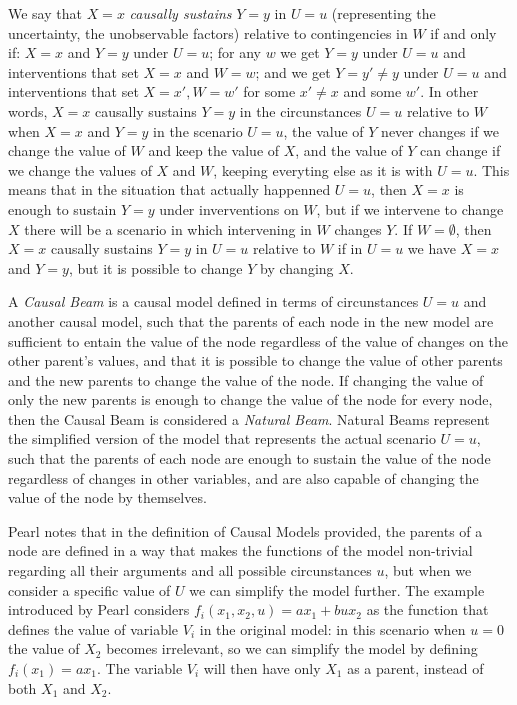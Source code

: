 We say that $X=x$ \emph{causally sustains} $Y=y$ in $U=u$ (representing the uncertainty, the unobservable factors) relative to contingencies in $W$ if and only if: $X=x$ and $Y=y$ under $U=u$; for any $w$ we get $Y=y$ under $U=u$ and interventions that set $X=x$ and $W=w$; and we get $Y=y' \neq y$ under $U=u$ and interventions that set $X=x',W=w'$ for some $x' \neq x$ and some $w'$. In other words, $X=x$ causally sustains $Y=y$ in the circunstances $U=u$ relative to $W$ when $X=x$ and $Y=y$ in the scenario $U=u$, the value of $Y$ never changes if we change the value of $W$ and keep the value of $X$, and the value of $Y$ can change if we change the values of $X$ and $W$, keeping everyting else as it is with $U=u$. This means that in the situation that actually happenned $U=u$, then $X=x$ is enough to sustain $Y=y$ under inverventions on $W$, but if we intervene to change $X$ there will be a scenario in which intervening in $W$ changes $Y$. If $W=\emptyset$, then $X=x$ causally sustains $Y=y$ in $U=u$ relative to $W$ if in $U=u$ we have $X=x$ and $Y=y$, but it is possible to change $Y$ by changing $X$.

A \emph{Causal Beam} is a causal model defined in terms of circunstances $U=u$ and another causal model, such that the parents of each node in the new model are sufficient to entain the value of the node regardless of the value of changes on the other parent's values, and that it is possible to change the value of other parents and the new parents to change the value of the node. If changing the value of only the new parents is enough to change the value of the node for every node, then the Causal Beam is considered a \emph{Natural Beam}. Natural Beams represent the simplified version of the model that represents the actual scenario $U=u$, such that the parents of each node are enough to sustain the value of the node regardless of changes in other variables, and are also capable of changing the value of the node by themselves. 

Pearl notes that in the definition of Causal Models provided, the parents of a node are defined in a way that makes the functions of the model non-trivial regarding all their arguments and all possible circunstances $u$, but when we consider a specific value of $U$ we can simplify the model further. The example introduced by Pearl considers $f_i(x_1,x_2,u) = ax_1+bux_2$ as the function that defines the value of variable $V_i$ in the original model: in this scenario when $u=0$ the value of $X_2$ becomes irrelevant, so we can simplify the model by defining $f_i(x_1) = ax_1$. The variable $V_i$ will then have only $X_1$ as a parent, instead of both $X_1$ and $X_2$. 

